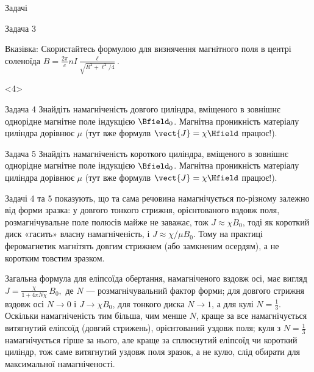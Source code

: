 \documentclass[onlytextwidth]{beamer}
\begin{document}
\begin{frame}[t]{Задачі}{}
\begin{onlyenv}
\begin{exampleblock}{Задача 3}
			\vspace*{1ex}

			Вказівка: Скористайтесь формулою для визнячення магнітного поля в центрі соленоїда $ B = \frac{2\pi}{c}{nI} \frac{\ell}{\sqrt{R^2 + \ell^2/4}}$. 
		\end{exampleblock}
	\end{onlyenv}
	\begin{onlyenv}
		\begin{exampleblock}{Задача 4}\justifying
			Знайдіть намагніченість довгого циліндра, вміщеного в зовнішнє однорідне магнітне поле індукцією $\Bfield_0$. Магнітна проникність матеріалу циліндра дорівнює $\mu$ (тут вже формулв $\vect{J} = \chi \Hfield$ працює!).
		\end{exampleblock}

		\begin{exampleblock}{Задача 5}\justifying
			Знайдіть намагніченість короткого циліндра, вміщеного в зовнішнє однорідне магнітне поле індукцією $\Bfield_0$. Магнітна проникність матеріалу циліндра дорівнює $\mu$ (тут вже формулв $\vect{J} = \chi \Hfield$ працює!).
		\end{exampleblock}
		\begin{alertblock}{}\justifying
	Задачі 4 та 5 показують, що та сама речовина намагнічується по-різному залежно від форми зразка: у довгого тонкого стрижня, орієнтованого вздовж поля, розмагнічувальне поле полюсів майже не заважає, тож \(J\approx\chi B_0\), тоді як короткий диск «гасить» власну намагніченість, і \(J\approx \chi/\mu B_0 \). Тому на практиці феромагнетик магнітять довгим стрижнем (або замкненим осердям), а не коротким товстим зразком.
		\end{alertblock}

		\begin{block}{}\scriptsize\color{blue}
			Загальна формула для еліпсоїда обертання, намагніченого вздовж осі, має вигляд
	\(
	J=\frac{\chi}{1+4\pi N\chi}\,B_0,
	\)
	де \(N\) --- розмагнічувальний фактор форми; для довгого стрижня вздовж осі \(N\to0\) і \(J\to\chi B_0\), для тонкого диска \(N\to1\), а для кулі \(N=\tfrac13\). Оскільки намагніченість тим більша, чим менше \(N\), краще за все намагнічується витягнутий еліпсоїд (довгий стрижень), орієнтований уздовж поля; куля з \(N=\tfrac13\) намагнічується гірше за нього, але краще за сплюснутий еліпсоїд чи короткий циліндр, тож саме витягнутий уздовж поля зразок, а не кулю, слід обирати для максимальної намагніченості.
		\end{block}
	\end{onlyenv}

\end{frame}
\end{document}
